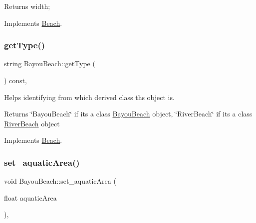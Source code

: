 \begin{DoxyReturn}{Returns}
width; 
\end{DoxyReturn}


Implements \hyperlink{class_beach_af28e3603ea98766d94c9e8eb9f76d509}{Beach}.

\mbox{\label{class_bayou_beach_aad2b96c052075911ae3c0d23fd38b067}} 
\subsubsection{\texorpdfstring{get\+Type()}{getType()}}
{\footnotesize\ttfamily string Bayou\+Beach\+::get\+Type (\begin{DoxyParamCaption}{ }\end{DoxyParamCaption}) const\hspace{0.3cm}{\ttfamily [inline]}, {\ttfamily [virtual]}}



Helps identifying from which derived class ths object is. 

\begin{DoxyReturn}{Returns}
\char`\"{}\+Bayou\+Beach\char`\"{} if it\textquotesingle{}s a class \hyperlink{class_bayou_beach}{Bayou\+Beach} object, \char`\"{}\+River\+Beach\char`\"{} if it\textquotesingle{}s a class \hyperlink{class_river_beach}{River\+Beach} object 
\end{DoxyReturn}


Implements \hyperlink{class_beach_a30001df535b2456e47611c7a0705660b}{Beach}.

\mbox{\label{class_bayou_beach_a45c742927ddd735983e92a89c7baba96}} 
\subsubsection{\texorpdfstring{set\+\_\+aquatic\+Area()}{set\_aquaticArea()}}
{\footnotesize\ttfamily void Bayou\+Beach\+::set\+\_\+aquatic\+Area (\begin{DoxyParamCaption}\item[{float}]{aquatic\+Area }\end{DoxyParamCaption})\hspace{0.3cm}{\ttfamily [inline]}, {\ttfamily [virtual]}}



